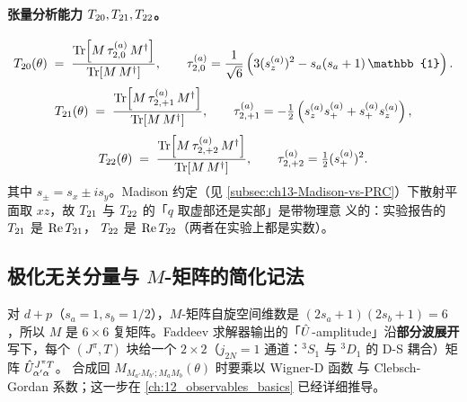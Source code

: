 \paragraph{张量分析能力 \({T_{20}}, {T_{21}}, {T_{22}}\)。}
\begin{equation}
\label{eq:ch13-T20-formula}
\Ttwentyzero(\theta)
\;=\;
\frac{\Tr\!\left[ M\,\tau_{2,0}^{(a)}\,M^\dagger\right]}
     {\Tr\!\left[ M\,M^\dagger\right]},
\qquad
\tau_{2,0}^{(a)} = \frac{1}{\sqrt{6}}\left(3 (s_z^{(a)})^2 - s_a(s_a+1)\,\mathbb{1}\right).
\end{equation}
\begin{equation}
\label{eq:ch13-T2pm1-formula}
{T_{21}}(\theta)
\;=\;
\frac{\Tr\!\left[ M\,\tau_{2,+1}^{(a)}\,M^\dagger\right]}
     {\Tr\!\left[ M\,M^\dagger\right]},
\qquad
\tau_{2,+1}^{(a)} = -\tfrac{1}{2}\left(s_z^{(a)} s_+^{(a)} + s_+^{(a)} s_z^{(a)}\right),
\end{equation}
\begin{equation}
\label{eq:ch13-T22-formula}
{T_{22}}(\theta)
\;=\;
\frac{\Tr\!\left[ M\,\tau_{2,+2}^{(a)}\,M^\dagger\right]}
     {\Tr\!\left[ M\,M^\dagger\right]},
\qquad
\tau_{2,+2}^{(a)} = \tfrac{1}{2}(s_+^{(a)})^2.
\end{equation}
其中 \(s_\pm = s_x \pm i s_y\)。Madison 约定（见
\cref{subsec:ch13-Madison-vs-PRC}）下散射平面取 \(xz\)，故
\({T_{21}}\) 与 \({T_{22}}\) 的「\(q\) 取虚部还是实部」是带物理意
义的：实验报告的 \({T_{21}}\) 是 \(\Re\Ttwentyone\)，
\({T_{22}}\) 是 \(\Re\Ttwentytwo\)（两者在实验上都是实数）。

\subsection{极化无关分量与 \(M\)-矩阵的简化记法}
\label{subsec:ch13-helicity-amplitudes}

对 \(d + p\)（\(s_a = 1, s_b = 1/2\)），\(M\)-矩阵自旋空间维数是
\((2 s_a+1)(2 s_b+1) = 6\)，所以 \(M\) 是 \(6\times 6\) 复矩阵。Faddeev
求解器输出的「\(\hat{U}\)-amplitude」沿\textbf{部分波展开}写下，每个
\((J^\pi, T)\) 块给一个 \(2\times 2\)（\(j_{2N} = 1\) 通道：\({}^3S_1\)
与 \({}^3D_1\) 的 D-S 耦合）矩阵 \(\hat{U}_{\alpha'\alpha}^{J^\pi T}\)。
合成回 \(M_{M_{a'}M_{b'}; M_a M_b}(\theta)\) 时要乘以 Wigner-D 函数
与 Clebsch-Gordan 系数；这一步在
\cref{ch:12_observables_basics} 已经详细推导。

